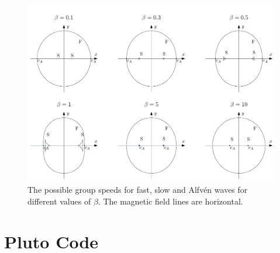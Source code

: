 \documentclass[a4paper]{article}
\numberwithin{figure}{section}
\numberwithin{equation}{section}
\begin{document}
\begin{figure}[h]
	\centering
	\includegraphics[width =\textwidth]{figures/groupspeed_beta.pdf}
	\caption{The possible group speeds for fast, slow and Alfv\'en waves for different values of $\beta$. The magnetic field lines are horizontal.}
	\label{fig:groupspeed_beta}
\end{figure}

\section{Pluto Code} \label{sec:pluto_code}
\end{document}
